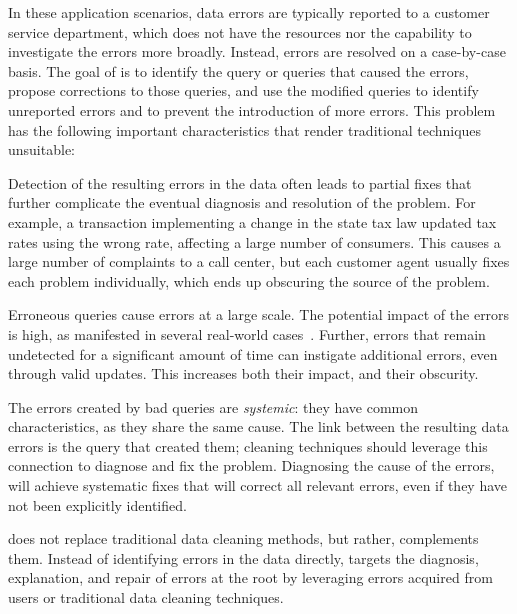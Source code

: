In these application scenarios, data errors are typically reported to
a customer service department, which does not have the resources nor
the capability to investigate the errors more broadly. Instead, errors
are resolved on a case-by-case basis. The goal of \sys is to identify
the query or queries that caused the errors, propose corrections to
those queries, and use the modified queries to identify unreported
errors and to prevent the introduction of more errors. This problem
has the following important characteristics that render traditional
techniques unsuitable:


\begin{description}[leftmargin=*, topsep=0mm, itemsep=0mm]
    
    \item[Obscurity.] Detection of the resulting errors in the data often
    leads to partial fixes that further complicate the eventual diagnosis and
    resolution of the problem. For example, a transaction implementing a
    change in the state tax law updated tax rates using the wrong rate,
    affecting a large number of consumers. This causes a large number of
    complaints to a call center, but each customer agent usually fixes each
    problem individually, which ends up obscuring the source of the problem.
    
    \item[Large impact.] Erroneous queries cause errors at a large scale. The
    potential impact of the errors is high, as manifested in several
    real-world cases~\cite{Yates10, Grady13, sakalerrors}. Further, errors
    that remain undetected for a significant amount of time can instigate
    additional errors, even through valid updates. This increases both their
    impact, and their obscurity.
    
    \item[Systemic errors.] The errors created by bad queries are
    \emph{systemic}: they have common characteristics, as they share the same
    cause. The link between the resulting data errors is the query that
    created them; cleaning techniques should leverage this connection to
    diagnose and fix the problem. Diagnosing the cause of the errors, will
    achieve systematic fixes that will correct all relevant errors, even if
    they have not been explicitly identified.
    
\end{description}
% 
\sys does not replace traditional data cleaning methods, but rather, complements them.
Instead of identifying errors in the data directly, 
\sys targets the diagnosis, explanation, and repair of errors at the root by
leveraging errors acquired from 
users or traditional data cleaning techniques.

